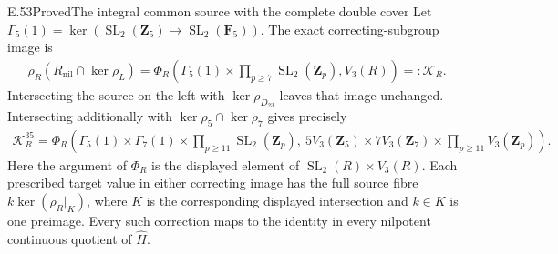 \begin{statement}{E.53}{Proved}{The integral common source with the complete double cover}
Let $\Gamma_5(1)=\ker(\operatorname{SL}_2(\mathbf Z_5)
\to\operatorname{SL}_2(\mathbf F_5))$.
The exact correcting-subgroup image is
\[
 \begin{split}
 \rho_R(R_{\mathrm{nil}}\cap\ker\rho_L)
   =\Phi_R\left(
       \Gamma_5(1)\times\prod_{p\geq7}\operatorname{SL}_2(\mathbf Z_p),
                           V_3(R)\right)
   =:\mathcal K_R.
 \end{split}
 \tag{E.53.4}
\]
Intersecting the source on the left with
$\ker\rho_{D_{23}}$ leaves that image unchanged.
Intersecting additionally with $\ker\rho_5\cap\ker\rho_7$
gives precisely
\[
 \begin{split}
 \mathcal K_R^{35}
   =\Phi_R\left(
       \Gamma_5(1)\times\Gamma_7(1)
          \times\prod_{p\geq11}\operatorname{SL}_2(\mathbf Z_p),
          \ 5V_3(\mathbf Z_5)\times7V_3(\mathbf Z_7)
               \times\prod_{p\geq11}V_3(\mathbf Z_p)\right).
 \end{split}
 \tag{E.53.5}
\]
Here the argument of $\Phi_R$ is the displayed element
of $\operatorname{SL}_2(R)\times V_3(R)$.
Each prescribed target value in either correcting image
has the full source fibre $k\ker(\rho_R|_K)$, where
$K$ is the corresponding displayed intersection and
$k\in K$ is one preimage.
Every such correction maps to the identity in every
nilpotent continuous quotient of $\widehat H$.
\end{statement}

